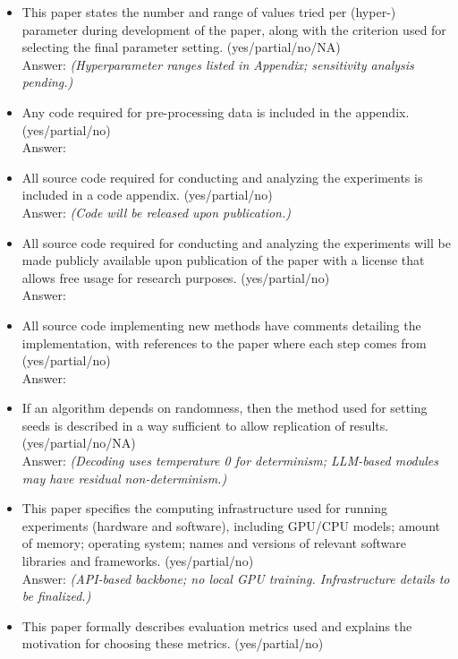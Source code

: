\begin{itemize}
    \item This paper states the number and range of values tried per (hyper-) parameter during development of the paper, along with the criterion used for selecting the final parameter setting. (yes/partial/no/NA)\\
    Answer: \answerPartial{} \textit{(Hyperparameter ranges listed in Appendix; sensitivity analysis pending.)}
    \item Any code required for pre-processing data is included in the appendix. (yes/partial/no)\\
    Answer: \answerPartial{}
    \item All source code required for conducting and analyzing the experiments is included in a code appendix. (yes/partial/no)\\
    Answer: \answerNO{} \textit{(Code will be released upon publication.)}
    \item All source code required for conducting and analyzing the experiments will be made publicly available upon publication of the paper with a license that allows free usage for research purposes. (yes/partial/no)\\
        Answer: \answerYes{}
    \item All source code implementing new methods have comments detailing the implementation, with references to the paper where each step comes from (yes/partial/no)\\
    Answer: \answerPartial{}
    \item If an algorithm depends on randomness, then the method used for setting seeds is described in a way sufficient to allow replication of results. (yes/partial/no/NA)\\
    Answer: \answerPartial{} \textit{(Decoding uses temperature 0 for determinism; LLM-based modules may have residual non-determinism.)}
    \item This paper specifies the computing infrastructure used for running experiments (hardware and software), including GPU/CPU models; amount of memory; operating system; names and versions of relevant software libraries and frameworks. (yes/partial/no)\\
        Answer: \answerPartial{} \textit{(API-based backbone; no local GPU training. Infrastructure details to be finalized.)}
    \item This paper formally describes evaluation metrics used and explains the motivation for choosing these metrics. (yes/partial/no)\\

\end{itemize}
